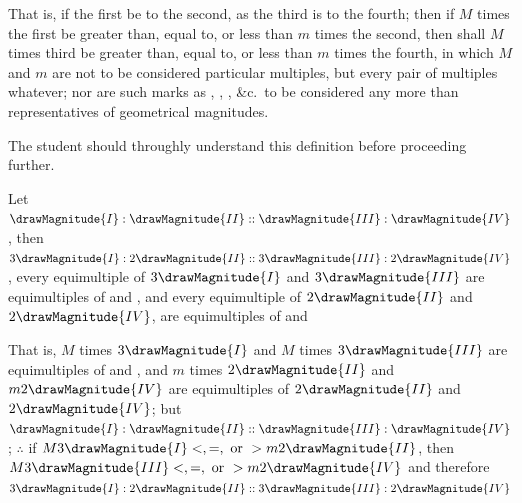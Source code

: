 \documentclass[booklanguage=english]{byrnebook}
\begin{document}
That is, if the first be to the second, as the third is to the fourth; then if $M$ times the first be greater than, equal to, or less than $m$ times the second, then shall $M$ times third be greater than, equal to, or less than $m$ times the fourth, in which $M$ and $m$ are not to be considered particular multiples, but every pair of multiples whatever; nor are such marks as , , , \&c.\ to be considered any more than representatives of geometrical magnitudes.

The student should throughly understand this definition before proceeding further.

\vfill\pagebreak


Let $\drawMagnitude{I} : \drawMagnitude{II} :: \drawMagnitude{III} : \drawMagnitude{IV}$, then $3\drawMagnitude{I} : 2\drawMagnitude{II} :: 3\drawMagnitude{III} : 2\drawMagnitude{IV}$, every equimultiple of $3\drawMagnitude{I}$ and $3\drawMagnitude{III}$ are equimultiples of  and , and every equimultiple of $2\drawMagnitude{II}$ and $2\drawMagnitude{IV}$, are equimultiples of  and  

That is, $M$ times $3\drawMagnitude{I}$ and $M$ times $3\drawMagnitude{III}$ are equimultiples of  and , and $m$ times $2\drawMagnitude{II}$ and $m 2\drawMagnitude{IV}$ are equimultiples of $2\drawMagnitude{II}$ and $2\drawMagnitude{IV}$; but $\drawMagnitude{I} : \drawMagnitude{II} :: \drawMagnitude{III} : \drawMagnitude{IV}$ \byref{\hypref}; $\therefore$ if $M 3\drawMagnitude{I} <, =, \mbox{ or } > m 2 \drawMagnitude{II}$, then $M 3\drawMagnitude{III} <, =, \mbox{ or } > m 2 \drawMagnitude{IV}$  and therefore $3\drawMagnitude{I} : 2\drawMagnitude{II} :: 3\drawMagnitude{III} : 2\drawMagnitude{IV}$ 
\end{document}
